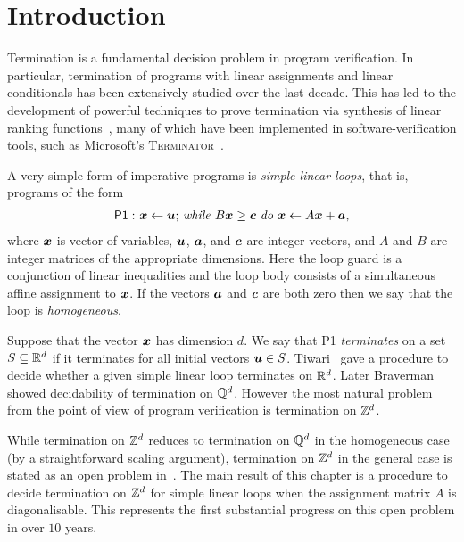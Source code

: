 \section{Introduction}
\label{sec:soda_intro}

Termination is a fundamental decision problem in program verification.
In particular, termination of programs with linear assignments and
linear conditionals has been extensively studied over the last decade.
This has led to the development of powerful techniques to
prove termination via synthesis of linear ranking
functions~\cite{Ben-AmramG13,BradleyMS05,ChenFM12,ColonS01,PodelskiR04},
many of which have been implemented in software-verification tools, such as
Microsoft's \textsc{Terminator}~\cite{CookPR06}.

A very simple form of imperative programs is \emph{simple linear
  loops}, that is, programs of the form
\begin{gather*}
\mathsf{P1:}\  \mbox{$\boldsymbol{x}\gets \boldsymbol{u}$;
\textit{while} $B\boldsymbol{x} \geq \boldsymbol{c}$ \textit{do}
$\boldsymbol{x}\leftarrow A\boldsymbol{x}+\boldsymbol{a}$,}
\end{gather*}
where $\boldsymbol{x}$ is vector of variables, $\boldsymbol{u}$,
$\boldsymbol{a}$, and $\boldsymbol{c}$ are integer vectors, and $A$
and $B$ are integer matrices of the appropriate dimensions.  Here the
loop guard is a conjunction of linear inequalities and the loop body
consists of a simultaneous affine assignment to $\boldsymbol{x}$.  If
the vectors $\boldsymbol{a}$ and $\boldsymbol{c}$ are both zero then
we say that the loop is \emph{homogeneous}.

Suppose that the vector $\boldsymbol{x}$ has dimension $d$.  We say
that \textsf{P1} \emph{terminates} on a set $S\subseteq \mathbb{R}^{d}$
if it terminates for all initial vectors $\boldsymbol{u} \in S$.
Tiwari~\cite{Tiw04} gave a procedure to decide whether a given simple
linear loop terminates on $\mathbb{R}^{d}$.  Later
Braverman~\cite{Bra06} showed decidability of termination on
$\mathbb{Q}^{d}$.  However the most natural problem from the point of
view of program verification is termination on $\mathbb{Z}^{d}$.

While termination on $\mathbb{Z}^{d}$ reduces to termination on
$\mathbb{Q}^{d}$ in the homogeneous case (by a straightforward scaling
argument), termination on $\mathbb{Z}^{d}$ in the general case is stated
as an open problem in~\cite{BGM12,Bra06,Tiw04}.  The main result of
this chapter is a procedure to decide termination on $\mathbb{Z}^{d}$ for
simple linear loops when the assignment matrix $A$ is diagonalisable.
This represents the first substantial progress on this open problem in
over $10$ years.

